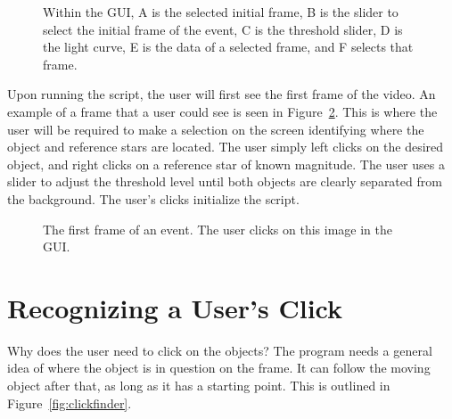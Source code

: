 \begin{figure}[htpb]
	\centering

	\caption{Within the GUI, A is the selected initial frame, B is the slider to select the initial frame of the event, C is the threshold slider, D is the light curve, E is the data of a selected frame, and F selects that frame.}
	\label{fig:gui}
\end{figure}

Upon running the script, the user will first see the first frame of the video. An example of a frame that a user could see is seen in Figure~\ref{fig:scene}. This is where the user will be required to make a selection on the screen identifying where the object and reference stars are located. The user simply left clicks on the desired object, and right clicks on a reference star of known magnitude. The user uses a slider to adjust the threshold level until both objects are clearly separated from the background. The user's clicks initialize the script. 

\begin{figure}[ht!]
	\centering
	\caption{The first frame of an event. The user clicks on this image in the GUI.}
	\label{fig:scene}
\end{figure}

\section{Recognizing a User's Click}

Why does the user need to click on the objects? The program needs a general idea of where the object is in question on the frame. It can follow the moving object after that, as long as it has a starting point. This is outlined in Figure~\ref{fig:clickfinder}.

